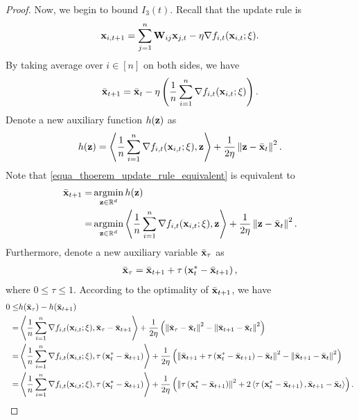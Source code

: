 \documentclass{article}
\begin{document}
\begin{proof}
Now, we begin to bound $I_3(t)$. Recall that the update rule is 
\begin{align}
\nonumber
{\bf x}_{i,t+1} = \sum_{j=1}^n {\bf W}_{ij}{\bf x}_{j,t} - \eta \nabla f_{i,t}({\bf x}_{i,t};\xi).
\end{align} By taking average over $i\in[n]$ on both sides, we have 
\begin{align}
\label{equa_thoerem_update_rule_equivalent}
\bar{{\bf x}}_{t+1} = \bar{{\bf x}}_t - \eta \left( \frac{1}{n}\sum_{i=1}^n \nabla f_{i,t}({\bf x}_{i,t};\xi) \right).
\end{align} 
Denote a new auxiliary function $h({\bf z})$ as 
\begin{align}
\nonumber
h({\bf z}) = \left\langle\frac{1}{n}\sum_{i=1}^n \nabla f_{i,t}({\bf x}_{i,t};\xi), {\bf z} \right\rangle + \frac{1}{2\eta}\left\lVert{\bf z} - \bar{{\bf x}}_t\right\rVert^2.
\end{align} Note that \eqref{equa_thoerem_update_rule_equivalent} is equivalent to 
\begin{align}
\nonumber
\bar{\x}_{t+1} = & \argmin_{\z\in\RR^d} h(\z) \\ \nonumber
= & \argmin_{\z\in\RR^d} \lrangle{\frac{1}{n}\sum_{i=1}^n \nabla f_{i,t}(\x_{i,t};\xi), \z} + \frac{1}{2\eta}\lrnorm{\z - \bar{\x}_t}^2.
\end{align} Furthermore, denote a new auxiliary variable $\bar{{\bf x}}_{\tau}$ as  
\begin{align}
\nonumber
\bar{{\bf x}}_{\tau} = \bar{{\bf x}}_{t+1} + \tau \left( {\bf x}_t^\ast - \bar{{\bf x}}_{t+1} \right),
\end{align} where $0\le \tau \le 1$. According to the optimality of $\bar{{\bf x}}_{t+1}$, we have
\begin{align}
\nonumber
0 \le & h(\bar{\x}_{\tau}) - h(\bar{\x}_{t+1}) \\ \nonumber
= & \lrangle{\frac{1}{n}\sum_{i=1}^n \nabla f_{i,t}(\x_{i,t};\xi), \bar{\x}_{\tau} - \bar{\x}_{t+1}} + \frac{1}{2\eta}\lrincir{ \lrnorm{\bar{\x}_{\tau} - \bar{\x}_t}^2 - \lrnorm{\bar{\x}_{t+1} - \bar{\x}_t}^2 } \\ \nonumber
= & \lrangle{\frac{1}{n}\sum_{i=1}^n \nabla f_{i,t}(\x_{i,t};\xi), \tau \lrincir{\x_t^\ast - \bar{\x}_{t+1}}} + \frac{1}{2\eta}\lrincir{ \lrnorm{\bar{\x}_{t+1} + \tau \lrincir{\x_t^\ast - \bar{\x}_{t+1}} - \bar{\x}_t}^2 - \lrnorm{\bar{\x}_{t+1} - \bar{\x}_t}^2 } \\ \nonumber
= & \lrangle{\frac{1}{n}\sum_{i=1}^n \nabla f_{i,t}(\x_{i,t};\xi), \tau \lrincir{\x_t^\ast - \bar{\x}_{t+1}}} + \frac{1}{2\eta}\lrincir{ \lrnorm{\tau \lrincir{\x_t^\ast - \bar{\x}_{t+1}}}^2 + 2\lrangle{\tau \lrincir{\x_t^\ast - \bar{\x}_{t+1}}, \bar{\x}_{t+1} - \bar{\x}_t } }.

\end{align}
\end{proof}
\end{document}
